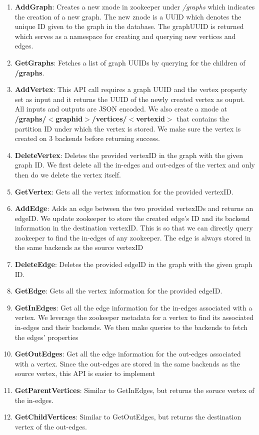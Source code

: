 \documentclass[letterpaper, 11 pt, conference]{ieeeconf}  %
\begin{document}
\begin{enumerate}
\item \textbf{AddGraph}: Creates a new znode in zookeeper under \textit{/graphs} which indicates the creation of a new graph. The new znode is a UUID which denotes the unique ID given to the graph in the database. The graphUUID is returned which serves as a namespace for creating and querying new vertices and edges.
\item \textbf{GetGraphs}: Fetches a list of graph UUIDs by querying for the children of \textbf{/graphs}.
\item \textbf{AddVertex}: This API call requires a graph UUID and the vertex property set as input and it returns the UUID of the newly created vertex as ouput. All inputs and outputs are JSON encoded. We also create a znode at \textbf{/graphs/$<$graphid$>$/vertices/$<$vertexid$>$} that contains the partition ID under which the vertex is stored. We make sure the vertex is created on 3 backends before returning success.
\item \textbf{DeleteVertex}: Deletes the provided vertexID in the graph with the given graph ID. We first delete all the in-edges and out-edges of the vertex and only then do we delete the vertex itself. 
\item \textbf{GetVertex}: Gets all the vertex information for the provided vertexID.
\item \textbf{AddEdge}: Adds an edge between the two provided vertexIDs and returns an edgeID. We update zookeeper to store the created edge's ID and its backend information in the destination vertexID. This is so that we can directly query zookeeper to find the in-edges of any zookeeper. The edge is always stored in the same backends as the source vertexID 
\item \textbf{DeleteEdge}:  Deletes the provided edgeID in the graph with the given graph ID.
\item \textbf{GetEdge}: Gets all the vertex information for the provided edgeID.
\item \textbf{GetInEdges}: Get all the edge information for the in-edges associated with a vertex. We leverage the zookeeper metadata for a vertex to find its associated in-edges and their backends. We then make queries to the backends to fetch the edges' properties
\item \textbf{GetOutEdges}: Get all the edge information for the out-edges associated with a vertex. Since the out-edges are stored in the same backends as the source vertex, this API is easier to implement
\item \textbf{GetParentVertices}: Similar to GetInEdges, but returns the soruce vertex of the in-edges.
\item \textbf{GetChildVertices}: Similar to GetOutEdges, but returns the destination vertex of the out-edges.
\end{enumerate}
\end{document}
